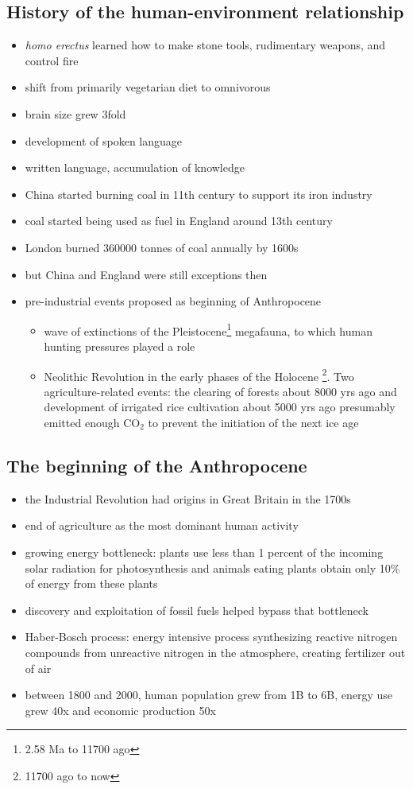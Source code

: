 \subsection{History of the human-environment relationship}
\begin{itemize}
	\item \textit{homo erectus} learned how to make stone tools,
	rudimentary weapons, and control fire
	\item shift from primarily vegetarian diet to omnivorous
	\item brain size grew 3fold
	\item development of spoken language
	\item written language, accumulation of knowledge
	\item China started burning coal in 11th century to support its iron
	industry
	\item coal started being used as fuel in England around 13th century
	\item London burned 360000 tonnes of coal annually by 1600s
	\item but China and England were still exceptions then
	\item pre-industrial events proposed as beginning of Anthropocene
	\begin{itemize}
		\item wave of extinctions of the Pleistocene\footnote{
		2.58 Ma to 11700 ago} megafauna, to which human hunting
		pressures played a role
		\item Neolithic Revolution in the early phases of the Holocene
		\footnote{11700 ago to now}. Two agriculture-related events:
		the clearing of forests about 8000 yrs ago and development of
		irrigated rice cultivation about 5000 yrs ago presumably
		emitted enough CO$_2$ to prevent the initiation of the next
		ice age
	\end{itemize}
\end{itemize}

\subsection{The beginning of the Anthropocene}
\begin{itemize}
	\item the Industrial Revolution had origins in Great Britain in the
	1700s
	\item end of agriculture as the most dominant human activity
	\item growing energy bottleneck: plants use less than 1 percent of the
	incoming solar radiation for photosynthesis and animals eating plants
	obtain only 10\% of energy from these plants
	\item discovery and exploitation of fossil fuels helped bypass that
	bottleneck
	\item Haber-Bosch process: energy intensive process synthesizing
	reactive nitrogen compounds from unreactive nitrogen in the atmosphere,
	creating fertilizer out of air
	\item between 1800 and 2000, human population grew from 1B to 6B,
	energy use grew 40x and economic production 50x
\end{itemize}

